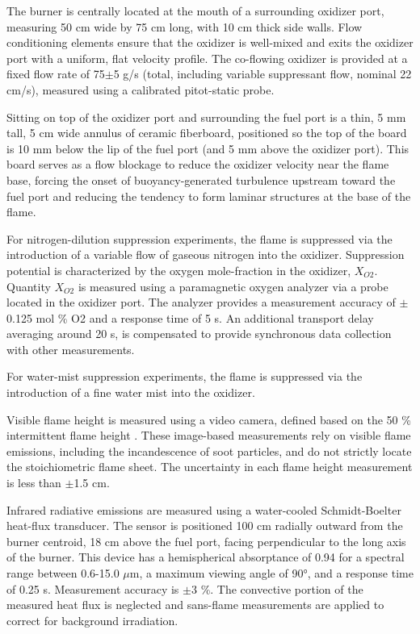 The burner is centrally located at the mouth of a surrounding oxidizer port, measuring 50 cm wide by 75 cm long, with 10 cm thick side walls. Flow conditioning elements ensure that the oxidizer is well-mixed and exits the oxidizer port with a uniform, flat velocity profile. The co-flowing oxidizer is provided at a fixed flow rate of 75$\pm$5 g/s (total, including variable suppressant flow, nominal 22 cm/s), measured using a calibrated pitot-static probe.

Sitting on top of the oxidizer port and surrounding the fuel port is a thin, 5 mm tall, 5 cm wide annulus of ceramic fiberboard, positioned so the top of the board is 10 mm below the lip of the fuel port (and 5 mm above the oxidizer port). This board serves as a flow blockage to reduce the oxidizer velocity near the flame base, forcing the onset of buoyancy-generated turbulence upstream toward the fuel port and reducing the tendency to form laminar structures at the base of the flame.

For nitrogen-dilution suppression experiments, the flame is suppressed via the introduction of a variable flow of gaseous nitrogen into the oxidizer. Suppression potential is characterized by the oxygen mole-fraction in the oxidizer, $X_{O2}$. Quantity $X_{O2}$ is measured using a paramagnetic oxygen analyzer via a probe located in the oxidizer port. The analyzer provides a measurement accuracy of $\pm$0.125 mol \% O2 and a response time of 5 s. An additional transport delay averaging around 20 s, is compensated to provide synchronous data collection with other measurements.

For water-mist suppression experiments, the flame is suppressed via the introduction of a fine water mist into the oxidizer.

Visible flame height is measured using a video camera, defined based on the 50 \% intermittent flame height \cite{White:2015}. These image-based measurements rely on visible flame emissions, including the incandescence of soot particles, and do not strictly locate the stoichiometric flame sheet. The uncertainty in each flame height measurement is less than $\pm$1.5 cm.

Infrared radiative emissions are measured using a water-cooled Schmidt-Boelter heat-flux transducer. The sensor is positioned 100 cm radially outward from the burner centroid, 18 cm above the fuel port, facing perpendicular to the long axis of the burner. This device has a hemispherical absorptance of 0.94 for a spectral range between 0.6-15.0 $\mu$m, a maximum viewing angle of 90\si{\degree}, and a response time of 0.25 s. Measurement accuracy is $\pm$3 \%. The convective portion of the measured heat flux is neglected and sans-flame measurements are applied to correct for background irradiation.

